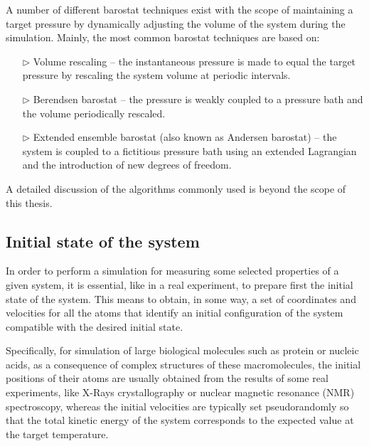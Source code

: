 A number of different barostat techniques exist with the scope of maintaining a target pressure by dynamically adjusting the volume of the system during the simulation. Mainly, the most common barostat techniques are based on:
\begin{itemize}
\item[$\triangleright$] Volume rescaling -- the instantaneous pressure is made to equal the target pressure by rescaling the system volume at periodic intervals.
\item[$\triangleright$] Berendsen barostat -- the pressure is weakly coupled to a pressure bath and the volume periodically rescaled.
\item[$\triangleright$] Extended ensemble barostat (also known as Andersen barostat) -- the system is coupled to a fictitious pressure bath using an extended Lagrangian and the introduction of new degrees of freedom.
\end{itemize}

A detailed discussion of the algorithms commonly used is beyond the scope of this thesis. 

\subsection{Initial state of the system}
In order to perform a simulation for measuring some selected properties of a given system, it is essential, like in a real experiment, to prepare first the initial state of the system. 
This means to obtain, in some way, a set of coordinates and velocities for all the atoms that identify an initial configuration of the system compatible with the desired initial state.

Specifically, for simulation of large biological molecules such as protein or nucleic acids, as a consequence of complex structures of these macromolecules, the initial positions of their atoms  are usually obtained from the results of some real experiments, like X-Rays crystallography or nuclear magnetic resonance (NMR) spectroscopy, whereas the initial velocities are typically set pseudorandomly so that the total kinetic energy of the system corresponds to the expected value at the target temperature.

